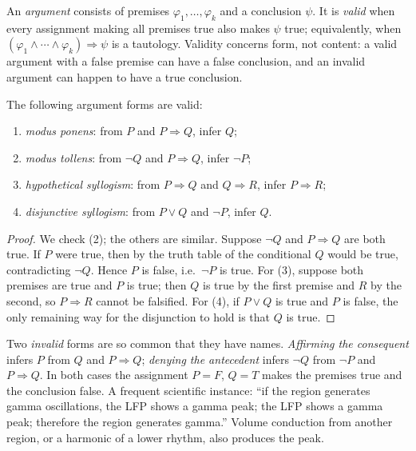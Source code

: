 An \emph{argument} consists of premises $\varphi_1,\ldots,\varphi_k$ and a conclusion $\psi$. It is \emph{valid} when every assignment making all premises true also makes $\psi$ true; equivalently, when $(\varphi_1\land\cdots\land\varphi_k)\Rightarrow\psi$ is a tautology. Validity concerns form, not content: a valid argument with a false premise can have a false conclusion, and an invalid argument can happen to have a true conclusion.

\begin{proposition}
The following argument forms are valid:
\begin{enumerate}[leftmargin=2em]
\item \emph{modus ponens}: from $P$ and $P\Rightarrow Q$, infer $Q$;
\item \emph{modus tollens}: from $\neg Q$ and $P\Rightarrow Q$, infer $\neg P$;
\item \emph{hypothetical syllogism}: from $P\Rightarrow Q$ and $Q\Rightarrow R$, infer $P\Rightarrow R$;
\item \emph{disjunctive syllogism}: from $P\lor Q$ and $\neg P$, infer $Q$.
\end{enumerate}
\end{proposition}
\begin{proof}
We check (2); the others are similar. Suppose $\neg Q$ and $P\Rightarrow Q$ are both true. If $P$ were true, then by the truth table of the conditional $Q$ would be true, contradicting $\neg Q$. Hence $P$ is false, i.e.\ $\neg P$ is true. For (3), suppose both premises are true and $P$ is true; then $Q$ is true by the first premise and $R$ by the second, so $P\Rightarrow R$ cannot be falsified. For (4), if $P\lor Q$ is true and $P$ is false, the only remaining way for the disjunction to hold is that $Q$ is true.
\end{proof}

Two \emph{invalid} forms are so common that they have names. \emph{Affirming the consequent} infers $P$ from $Q$ and $P\Rightarrow Q$; \emph{denying the antecedent} infers $\neg Q$ from $\neg P$ and $P\Rightarrow Q$. In both cases the assignment $P=F$, $Q=T$ makes the premises true and the conclusion false. A frequent scientific instance: ``if the region generates gamma oscillations, the LFP shows a gamma peak; the LFP shows a gamma peak; therefore the region generates gamma.'' Volume conduction from another region, or a harmonic of a lower rhythm, also produces the peak.

